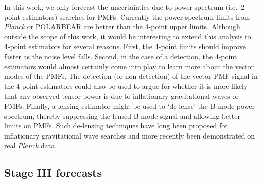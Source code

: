 \documentclass[apj]{emulateapj}
\newcommand{\apmf}{\ensuremath{A_{\rm PMF}}}
\newcommand{\lcdm}{\ensuremath{\Lambda}CDM}
\newcommand{\planck}{{\sl Planck}}
\newcommand{\pb}{POLARBEAR}
\newcommand{\tbd}[1]{\textcolor{Red}{{\bf TBD}: #1}}
\begin{document}
In this work, we only forecast the uncertainties due to power spectrum (i.e.~2-point estimators) searches for PMFs. 
Currently the power spectrum limits from \planck{} or \pb{} are better than the 4-point upper limits. 
Although outside the scope of this work, it would be interesting to extend this analysis to 4-point estimators for several reasons. 
First, the 4-point limits should improve faster as the noise level falls. 
Second, in the case of a detection, the 4-point estimators would almost certainly come into play to learn more about the vector modes of the PMFs. 
The detection (or non-detection) of the vector PMF signal in the 4-point estimators could also be used to argue for whether it is more likely that any observed tensor power is due to  inflationary gravitational waves or  PMFs. 
Finally, a lensing estimator might be used to `de-lense' the B-mode power spectrum, thereby suppressing the lensed B-mode signal and allowing better limits on PMFs. 
Such de-lensing techniques have long been proposed for inflationary gravitational wave searches \citep[e.g.][]{knox02,kesden02,seljak04a,simard15} and more recently been demonstrated on real \planck{} data \citep{larsen16}. 


\subsection{Stage III forecasts}
\end{document}
